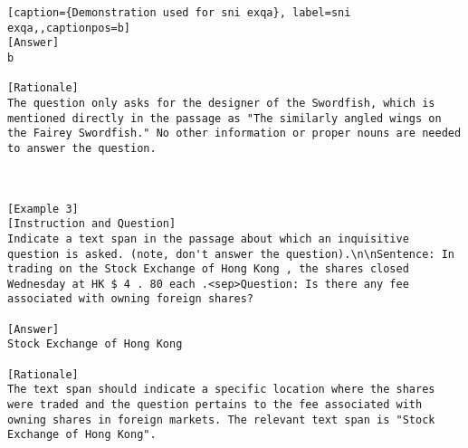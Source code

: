 \begin{lstlisting}[caption={Demonstration used for sni exqa}, label=sni exqa,,captionpos=b]
[Answer]
b

[Rationale]
The question only asks for the designer of the Swordfish, which is mentioned directly in the passage as "The similarly angled wings on the Fairey Swordfish." No other information or proper nouns are needed to answer the question.



[Example 3]
[Instruction and Question]
Indicate a text span in the passage about which an inquisitive question is asked. (note, don't answer the question).\n\nSentence: In trading on the Stock Exchange of Hong Kong , the shares closed Wednesday at HK $ 4 . 80 each .<sep>Question: Is there any fee associated with owning foreign shares?

[Answer]
Stock Exchange of Hong Kong

[Rationale]
The text span should indicate a specific location where the shares were traded and the question pertains to the fee associated with owning shares in foreign markets. The relevant text span is "Stock Exchange of Hong Kong".




\end{lstlisting}
